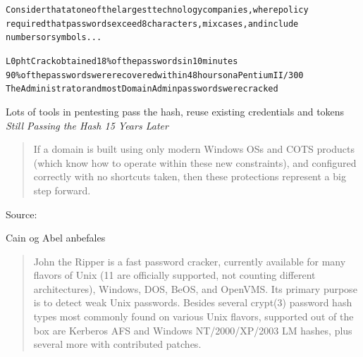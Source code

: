 \documentclass[20pt,landscape,a4paper,footrule]{foils}
\begin{document}
\begin{alltt}
\small
Consider that at one of the largest technology companies, where policy
required that passwords exceed 8 characters, mix cases, and include
numbers or symbols...

L0phtCrack obtained 18\% of the passwords in 10 minutes
90\% of the passwords were recovered within 48 hours on a Pentium II/300
The Administrator and most Domain Admin passwords were cracked
\end{alltt}


Lots of tools in pentesting pass the hash, reuse existing credentials and tokens
\emph{Still Passing the Hash 15 Years Later}

\begin{quote}
If a domain is built using only modern Windows OSs and COTS products (which know how to operate within these new constraints), and configured correctly with no shortcuts taken, then these protections represent a big step forward.
\end{quote}

Source:\\
{\small{}
}




\begin{list1}
\item  Cain og Abel anbefales   
\end{list1}


\begin{quote}
John the Ripper is a fast password cracker, currently available for
many flavors of Unix (11 are officially supported, not counting
different architectures), Windows, DOS, BeOS, and OpenVMS. Its primary
purpose is to detect weak Unix passwords. Besides several crypt(3)
password hash types most commonly found on various Unix flavors,
supported out of the box are Kerberos AFS and Windows NT/2000/XP/2003
LM hashes, plus several more with contributed patches.
\end{quote}
\end{document}
